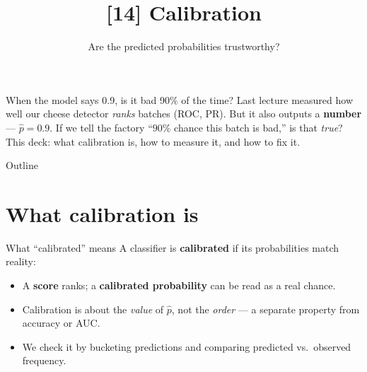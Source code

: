 \documentclass[aspectratio=169]{beamer}
\title{[14] Calibration}
\subtitle{Are the predicted probabilities trustworthy?}
\date{}
\begin{document}
\begin{frame}{When the model says 0.9, is it bad 90\% of the time?}
  Last lecture measured how well our cheese detector \emph{ranks} batches (ROC, PR). But it
  also outputs a \textbf{number} --- $\hat p = 0.9$. If we tell the factory ``$90\%$ chance
  this batch is bad,'' is that \emph{true}?
  \vfill
  \vfill
  This deck: what calibration is, how to measure it, and how to fix it.
\end{frame}

\begin{frame}{Outline}
  \tableofcontents
\end{frame}

\section{What calibration is}

\begin{frame}{What ``calibrated'' means}
  A classifier is \textbf{calibrated} if its probabilities match reality:
  \vfill
  \vfill
  \begin{itemize}
    \item A \textbf{score} ranks; a \textbf{calibrated probability} can be read as a real chance.
    \item Calibration is about the \emph{value} of $\hat p$, not the \emph{order} --- a separate
      property from accuracy or AUC.
    \item We check it by bucketing predictions and comparing predicted vs.\ observed frequency.
  \end{itemize}
\end{frame}
\end{document}
